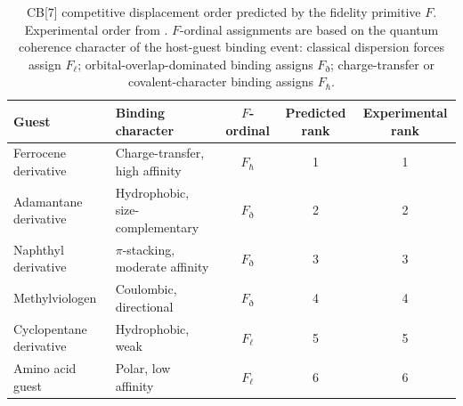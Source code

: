 \documentclass[12pt,a4paper]{article}
\begin{document}
\begin{table}[htbp]
\centering
\caption{CB[7] competitive displacement order predicted by the fidelity
primitive $F$. Experimental order from \cite{assaf2015}.
$F$-ordinal assignments are based on the quantum coherence character
of the host-guest binding event: classical dispersion forces assign
$F_\ell$; orbital-overlap-dominated binding assigns $F_\eth$;
charge-transfer or covalent-character binding assigns $F_\hbar$.}
\label{tab:cb7}
\small
\begin{tabular}{@{}llccc@{}}
\toprule
Guest & Binding character & $F$-ordinal & Predicted rank & Experimental rank \\
\midrule
Ferrocene derivative    & Charge-transfer, high affinity  & $F_\hbar$ & 1 & 1 \\
Adamantane derivative   & Hydrophobic, size-complementary & $F_\eth$  & 2 & 2 \\
Naphthyl derivative     & $\pi$-stacking, moderate affinity & $F_\eth$ & 3 & 3 \\
Methylviologen          & Coulombic, directional          & $F_\eth$  & 4 & 4 \\
Cyclopentane derivative & Hydrophobic, weak               & $F_\ell$  & 5 & 5 \\
Amino acid guest        & Polar, low affinity             & $F_\ell$  & 6 & 6 \\
\bottomrule
\end{tabular}
\end{table}
\end{document}
